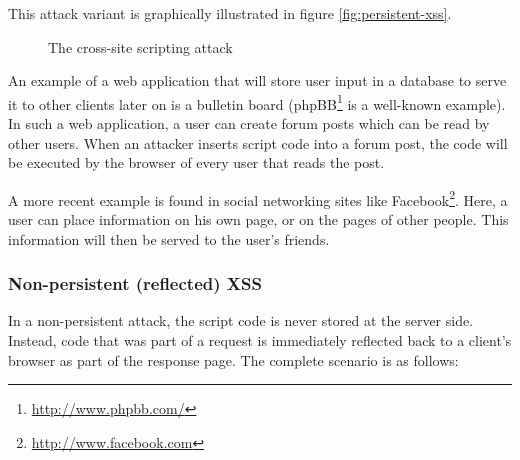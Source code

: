 This attack variant is graphically illustrated in figure \ref{fig:persistent-xss}.

\begin{figure}[ht]
	\centering
	\caption{The cross-site scripting attack}
\end{figure}

An example of a web application that will store user input in a database to serve it to other clients later on is a bulletin board (phpBB\footnote{\url{http://www.phpbb.com/}} is a well-known example). In such a web application, a user can create forum posts which can be read by other users. When an attacker inserts script code into a forum post, the code will be executed by the browser of every user that reads the post.

A more recent example is found in social networking sites like Facebook\footnote{\url{http://www.facebook.com}}. Here, a user can place information on his own page, or on the pages of other people. This information will then be served to the user's friends.

\subsubsection{Non-persistent (reflected) XSS}
In a non-persistent attack, the script code is never stored at the server side. Instead, code that was part of a request is immediately reflected back to a client's browser as part of the response page. The complete scenario is as follows:

